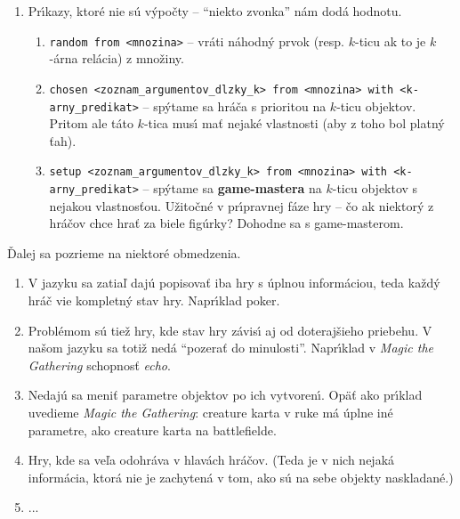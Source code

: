 \documentclass[a4paper,12pt]{article}
\begin{document}
\begin{enumerate}
    \item Pr\'{\i}kazy, ktor\'{e} nie s\'{u} v\'{y}po\v{c}ty --
    ``niekto zvonka'' n\'{a}m dod\'{a} hodnotu.
    \begin{enumerate}
        \item \verb|random from <mnozina>| -- vr\'{a}ti n\'{a}hodn\'{y}
        prvok (resp. $k$-ticu ak to je $k$-\'{a}rna rel\'{a}cia) z mno\v{z}iny.
        \item \verb|chosen <zoznam_argumentov_dlzky_k> from <mnozina> with <k-arny_predikat>| --
        sp\'{y}tame sa hr\'{a}\v{c}a s prioritou na $k$-ticu objektov. Pritom ale t\'{a}to $k$-tica
        mus\'{\i} ma\v{t} nejak\'{e} vlastnosti (aby z toho bol platn\'{y} \v{t}ah).
        \item \verb|setup <zoznam_argumentov_dlzky_k> from <mnozina> with <k-arny_predikat>| --
        sp\'{y}tame sa \textbf{game-mastera} na $k$-ticu objektov s nejakou vlastnos\v{t}ou.
        U\v{z}ito\v{c}n\'{e} v pr\'{\i}pravnej f\'{a}ze hry -- \v{c}o ak
        niektor\'{y} z hr\'{a}\v{c}ov chce hra\v{t} za biele fig\'{u}rky?
        Dohodne sa s game-masterom.
    \end{enumerate}
\end{enumerate}

\v{D}alej sa pozrieme na niektor\'{e} obmedzenia.

\begin{enumerate}
    \item V jazyku sa zatia\v{l} daj\'{u} popisova\v{t} iba hry s \'{u}plnou
    inform\'{a}ciou, teda ka\v{z}d\'{y} hr\'{a}\v{c} vie kompletn\'{y} stav
    hry. Napr\'{\i}klad poker.
    \item Probl\'{e}mom s\'{u} tie\v{z} hry, kde stav hry z\'{a}vis\'{\i}
    aj od doteraj\v{s}ieho priebehu. V na\v{s}om jazyku sa toti\v{z}
    ned\'{a} ``pozera\v{t} do minulosti''. Napr\'{\i}klad v
    \emph{Magic the Gathering} schopnos\v{t} \emph{echo}.
    \item Nedaj\'{u} sa meni\v{t} parametre objektov po ich vytvoren\'{\i}.
    Op\"{a}\v{t} ako pr\'{\i}klad uvedieme \emph{Magic the Gathering}:
    creature karta v ruke m\'{a} \'{u}plne in\'{e} parametre, ako
    creature karta na battlefielde.
    \item Hry, kde sa ve\v{l}a odohr\'{a}va v hlav\'{a}ch hr\'{a}\v{c}ov.
    (Teda je v nich nejak\'{a} inform\'{a}cia, ktor\'{a} nie je zachyten\'{a}
    v tom, ako s\'{u} na sebe objekty naskladan\'{e}.)
    \item ...
\end{enumerate}
\end{document}
